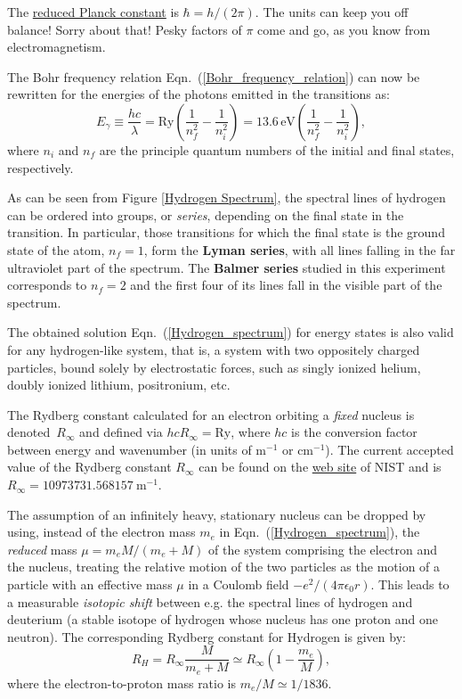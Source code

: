 \documentclass[12pt]{article}
\begin{document}
The \href{https://physics.nist.gov/cgi-bin/cuu/Value?hbar}{reduced Planck constant} is $\hbar=h/(2\pi)$.  The units can keep you off balance!  Sorry about that! Pesky factors of $\pi$ come and go, as you know from electromagnetism.

The Bohr frequency relation Eqn.~(\ref{Bohr_frequency_relation}) can now be rewritten for the energies of the photons emitted in the transitions as:
\begin{equation}\label{photon-energies}
    E_{\gamma} \equiv \frac{hc}{\lambda} = \text{Ry} \left(\frac{1}{n_f^2}-\frac{1}{n_i^2}\right) = 13.6\,\text{eV} \left(\frac{1}{n_f^2}-\frac{1}{n_i^2}\right),
\end{equation}
where $n_i$ and $n_f$ are the principle quantum numbers of the initial and final states, respectively.

As can be seen from Figure \ref{Hydrogen Spectrum}, the spectral lines of hydrogen can be ordered into groups, or \textit{series}, depending on the final state in the transition. In particular, those transitions for which the final state is the ground state of the atom, $n_f=1$, form the \textbf{Lyman series}, with all lines falling in the far ultraviolet part of the spectrum. The \textbf{Balmer series} studied in this experiment corresponds to $n_f=2$ and the first four of its lines fall in the visible part of the spectrum.

The obtained solution Eqn.~(\ref{Hydrogen_spectrum}) for energy states is also valid for any hydrogen-like system, that is, a system with two oppositely charged particles, bound solely by electrostatic forces, such as singly ionized helium, doubly ionized lithium, positronium, etc.

The Rydberg constant calculated for an electron orbiting a \textit{fixed} nucleus is denoted~$R_{\infty}$ and defined via $hc R_{\infty} = \text{Ry}$, where $hc$ is the conversion factor between energy and wavenumber (in units of m$^{-1}$ or cm$^{-1}$). The current accepted value of the Rydberg constant $R_{\infty}$ can be found on the \href{https://physics.nist.gov/cgi-bin/cuu/Value?ryd}{web site} of NIST and is $R_{\infty} = 10 973 731.568 157~\text{m}^{-1}$.

The assumption of an infinitely heavy, stationary nucleus can be dropped by using, instead of the electron mass $m_e$ in Eqn.~(\ref{Hydrogen_spectrum}), the \textit{reduced} mass $\mu = m_e M/(m_e+M)$ of the system comprising the electron and the nucleus, treating the relative motion of the two particles as the motion of a particle with an effective mass $\mu$ in a Coulomb field $-e^2/(4\pi \epsilon_0 r)$. This leads to a measurable \textit{isotopic shift} between e.g. the spectral lines of hydrogen and deuterium (a stable isotope of hydrogen whose nucleus has one proton and one neutron). The corresponding Rydberg constant for Hydrogen is given by:
\begin{equation}
    R_H = R_{\infty} \frac{M}{m_e+M} \simeq R_{\infty} \left( 1- \frac{m_e}{M} \right),
\end{equation}
where the electron-to-proton mass ratio is $m_e/M \simeq 1/1836$.
\end{document}
